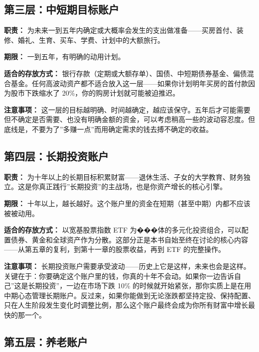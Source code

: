 \documentclass[a4paper,11pt,oneside,fontset=none,UTF8,zihao=-4]{ctexbook}
\begin{document}
\subsection{第三层：中短期目标账户}\label{ux7b2cux4e09ux5c42ux4e2dux77edux671fux76eeux6807ux8d26ux6237}

\textbf{职责：}
为未来一到五年内确定或大概率会发生的支出做准备------买房首付、装修、婚礼、生育、买车、学费、计划中的大额旅行。

\textbf{期限：} 一到五年，有明确的动用计划。

\textbf{适合的存放方式：}
银行存款（定期或大额存单）、国债、中短期债券基金、偏债混合基金。任何高波动资产都不适合放入这一层------如果你计划明年买房的首付款因为股市下跌缩水了
20\%，你的购房计划就可能被迫推迟。

\textbf{注意事项：}
这一层的目标越明确、时间越确定，越应该保守。五年后才可能需要但不确定是否需要、也没有明确金额的资金，可以考虑稍高一些的波动容忍度。但底线是，不要为了''多赚一点''而用确定需求的钱去搏不确定的收益。

\subsection{第四层：长期投资账户}\label{ux7b2cux56dbux5c42ux957fux671fux6295ux8d44ux8d26ux6237}

\textbf{职责：}
为十年以上的长期目标积累财富------退休生活、子女的大学教育、财务独立。这是你真正践行''长期投资''的主战场，也是你资产增长的核心引擎。

\textbf{期限：}
十年以上，越长越好。这个账户里的资金在短期（甚至中期）内都不应该被被动用。

\textbf{适合的存放方式：} 以宽基股票指数 ETF
为���体的多元化投资组合，可以配置债券、黄金和全球资产作为分散。这部分正是本书自始至终在讨论的核心内容------从第五章的复利，到第十一章的股票收益，再到
ETF 的完整操作。

\textbf{注意事项：}
长期投资账户需要承受波动------历史上它是这样，未来也会是这样。关键在于：你要确定这个账户里的钱，你真的十年不会动。如果你一边告诉自己''这是长期投资''，一边在市场下跌
10\%
的时候就开始紧张，那你实质上是在用中期心态管理长期账户。反过来，如果你能做到无论涨跌都坚持定投、保持配置、只在人生阶段发生变化时调整比例，那么这个账户最终会成为你所有财富中增长最快的那一个。

\subsection{第五层：养老账户}\label{ux7b2cux4e94ux5c42ux517bux8001ux8d26ux6237}
\end{document}

